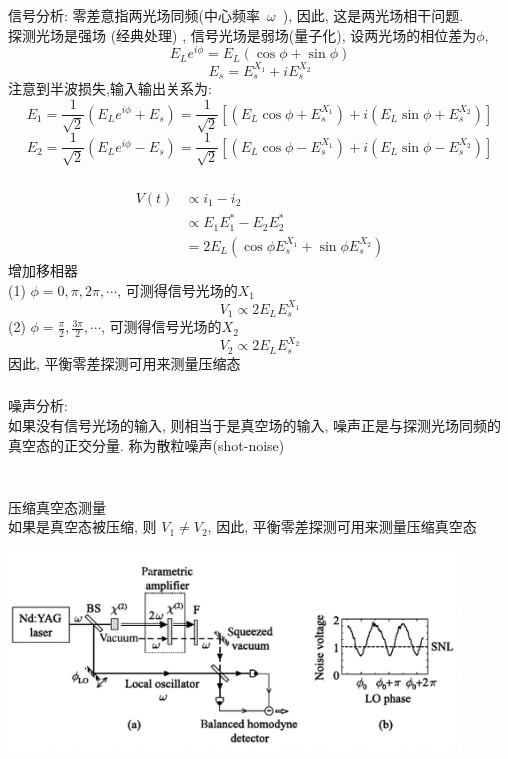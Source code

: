    
   \begin{frame}
       \frametitle{~}
       {\Bullet}信号分析: {\vspace*{0.3em}}
       零差意指两光场同频(中心频率~$\omega$~), 因此, 这是两光场相干问题. \\ 探测光场是强场 (经典处理) , 信号光场是弱场(量子化), 设两光场的相位差为$\phi$, 
       \[ E_L e^{i\phi} = E_L(\cos\phi + \sin\phi)\]
       \[ E_s  =  E_s ^{X_1}  + i E_s ^{X_2}\]
       注意到半波损失,输入输出关系为:
       \[ E_1  =  \frac{1}{\sqrt{2}} (E_L e^{i\phi} + E_s) = \frac{1}{\sqrt{2}} [ (E_L\cos\phi + E_s ^{X_1} ) + i (E_L\sin\phi + E_s ^{X_2} ) ]\]
       \[ E_2  =  \frac{1}{\sqrt{2}} (E_L e^{i\phi} - E_s) = \frac{1}{\sqrt{2}} [ (E_L\cos\phi - E_s ^{X_1} ) + i (E_L\sin\phi - E_s ^{X_2} ) ] \] 
      \end{frame}
   
      \begin{frame}
       \frametitle{}
       \[ \begin{aligned}
           V(t) &\propto  i_1 - i_2 \\ 
           &\propto  E_1 E^* _1 - E_2 E^* _2  \\ 
           &= 2 E_L ( \cos \phi E_s ^{X_1} + \sin \phi E_s ^{X_2} )
       \end{aligned} \]
       增加移相器\\  
       (1)  $\phi= 0, \pi, 2\pi, \cdots $, 可测得信号光场的$X_1$
       \[ V_1 \propto 2 E_L E_s ^{X_1} \]
       (2)  $\phi= \frac{\pi}{2}, \frac{3\pi}{2}, \cdots $, 可测得信号光场的$X_2$
       \[ V_2 \propto 2 E_L E_s ^{X_2} \]
       因此, 平衡零差探测可用来测量压缩态
      \end{frame}
   
      \begin{frame}
       \frametitle{}
       {\Bullet}噪声分析: \\ 
       如果没有信号光场的输入, 则相当于是真空场的输入, 噪声正是与探测光场同频的真空态的正交分量. 称为散粒噪声(shot-noise)  
   \end{frame}
   
   \begin{frame}
         \frametitle{}
         ~~\\ 
       {\Bullet}压缩真空态测量 \\ 
       如果是真空态被压缩, 则  $ V_1 \not= V_2$, 因此, 平衡零差探测可用来测量压缩真空态
         \begin{center}
              \includegraphics[width=0.9\textwidth]{figs/15.png}
         \end{center}
      \end{frame}